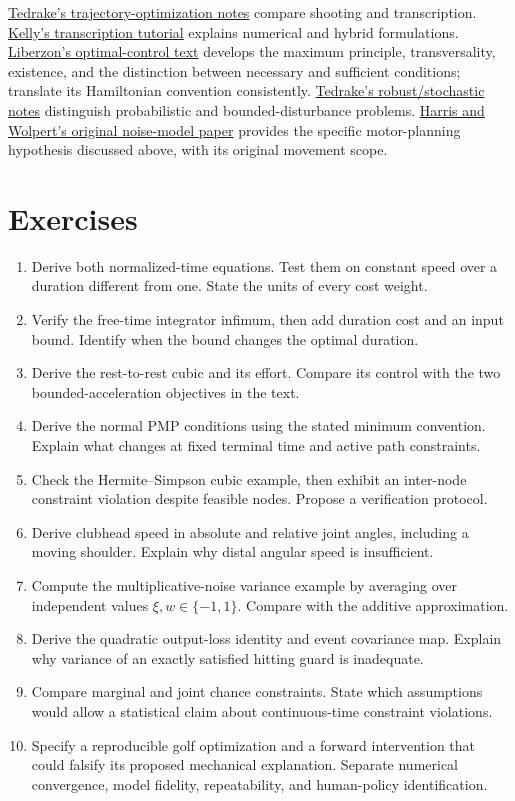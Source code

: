 \href{https://underactuated.mit.edu/trajopt.html}{Tedrake's trajectory-optimization
notes} compare shooting and transcription. \href{https://arxiv.org/abs/1707.00284}{Kelly's
transcription tutorial} explains numerical and hybrid formulations.
\href{https://liberzon.csl.illinois.edu/teaching/cvoc/node1.html}{Liberzon's
optimal-control text} develops the maximum principle, transversality,
existence, and the distinction between necessary and sufficient conditions;
translate its Hamiltonian convention consistently.
\href{https://underactuated.mit.edu/robust.html}{Tedrake's robust/stochastic
notes} distinguish probabilistic and bounded-disturbance problems.
\href{https://www.nature.com/articles/29528}{Harris and Wolpert's original
noise-model paper} provides the specific motor-planning hypothesis discussed
above, with its original movement scope.

\section{Exercises}

\begin{enumerate}[itemsep=3pt,parsep=0pt]
\item Derive both normalized-time equations. Test them on constant speed
over a duration different from one. State the units of every cost weight.
\item Verify the free-time integrator infimum, then add duration cost and
an input bound. Identify when the bound changes the optimal duration.
\item Derive the rest-to-rest cubic and its effort. Compare its control
with the two bounded-acceleration objectives in the text.
\item Derive the normal PMP conditions using the stated minimum convention.
Explain what changes at fixed terminal time and active path constraints.
\item Check the Hermite--Simpson cubic example, then exhibit an inter-node
constraint violation despite feasible nodes. Propose a verification protocol.
\item Derive clubhead speed in absolute and relative joint angles, including
a moving shoulder. Explain why distal angular speed is insufficient.
\item Compute the multiplicative-noise variance example by averaging over
independent values $\xi,w\in\{-1,1\}$. Compare with the additive approximation.
\item Derive the quadratic output-loss identity and event covariance map.
Explain why variance of an exactly satisfied hitting guard is inadequate.
\item Compare marginal and joint chance constraints. State which assumptions
would allow a statistical claim about continuous-time constraint violations.
\item Specify a reproducible golf optimization and a forward intervention
that could falsify its proposed mechanical explanation. Separate numerical
convergence, model fidelity, repeatability, and human-policy identification.
\end{enumerate}

